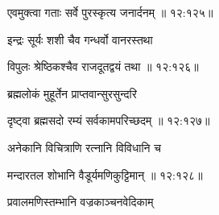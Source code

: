 
{\devanagarifont एवमुक्त्वा गताः सर्वे पुरस्कृत्य जनार्दनम् {॥ १२:१२५॥} \veg\dontdisplaylinenum }%

{\devanagarifont इन्द्रः सूर्यः शशी चैव गन्धर्वो वानरस्तथा \thinspace{\dandab} \dontdisplaylinenum }%


{\devanagarifont विपुलः श्रेष्ठिकश्चैव राजदूतद्वयं तथा {॥ १२:१२६॥} \veg\dontdisplaylinenum }%

{\devanagarifont ब्रह्मलोकं मुहूर्तेन प्राप्तवान्सुरसुन्दरि \thinspace{\dandab} \dontdisplaylinenum }%


{\devanagarifont दृष्ट्वा ब्रह्मसदो रम्यं सर्वकामपरिच्छदम् {॥ १२:१२७॥} \veg\dontdisplaylinenum }%

{\devanagarifont अनेकानि विचित्राणि रत्नानि विविधानि च \thinspace{\dandab} \dontdisplaylinenum }%
 

{\devanagarifont मन्दारतल शोभानि वैडूर्यमणिकुट्टिमान् {॥ १२:१२८॥} \veg\dontdisplaylinenum }%

{\devanagarifont प्रवालमणिस्तम्भानि वज्रकाञ्चनवेदिकाम् \thinspace{\dandab} \dontdisplaylinenum }%


